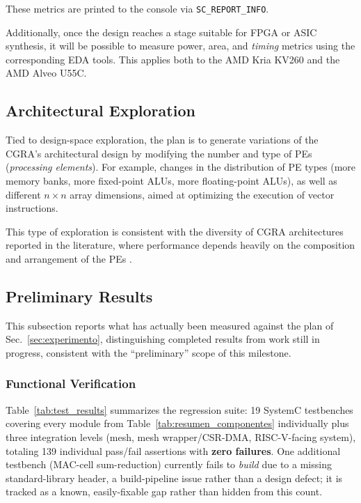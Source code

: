 \documentclass[conference]{IEEEtran}
\begin{document}
These metrics are printed to the console via \texttt{SC\_REPORT\_INFO}.

Additionally, once the design reaches a stage suitable for FPGA or ASIC synthesis, it will be possible to measure power, area, and \textit{timing} metrics using the corresponding EDA tools. This applies both to the AMD Kria KV260 and the AMD Alveo U55C.


\subsection{Architectural Exploration}

Tied to design-space exploration, the plan is to generate variations of the CGRA's architectural design by modifying the number and type of PEs (\textit{processing elements}). For example, changes in the distribution of PE types (more memory banks, more fixed-point ALUs, more floating-point ALUs), as well as different $n \times n$ array dimensions, aimed at optimizing the execution of vector instructions.

This type of exploration is consistent with the diversity of CGRA architectures reported in the literature, where performance depends heavily on the composition and arrangement of the PEs \cite{Podobas}.

\subsection{Preliminary Results}
\label{sec:results}

This subsection reports what has actually been measured against the plan of Sec.~\ref{sec:experimento}, distinguishing completed results from work still in progress, consistent with the ``preliminary'' scope of this milestone.

\subsubsection{Functional Verification}
Table~\ref{tab:test_results} summarizes the regression suite: 19 SystemC testbenches covering every module from Table~\ref{tab:resumen_componentes} individually plus three integration levels (mesh, mesh wrapper/CSR-DMA, RISC-V-facing system), totaling 139 individual pass/fail assertions with \textbf{zero failures}. One additional testbench (MAC-cell sum-reduction) currently fails to \emph{build} due to a missing standard-library header, a build-pipeline issue rather than a design defect; it is tracked as a known, easily-fixable gap rather than hidden from this count.
\end{document}
